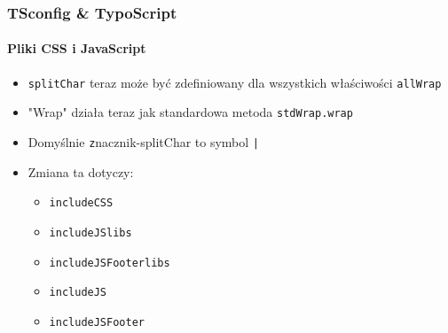 
\begin{frame}[fragile]
	\frametitle{TSconfig \& TypoScript}
	\framesubtitle{Pliki CSS i JavaScript}

	\begin{itemize}
		\item \texttt{splitChar} teraz może być zdefiniowany dla wszystkich właściwości \texttt{allWrap}
		\item "Wrap" działa teraz jak standardowa metoda \texttt{stdWrap.wrap}
		\item Domyślnie \texttt znacznik-{splitChar} to symbol \texttt{|}
		\item Zmiana ta dotyczy:

			\begin{itemize}
				\item \texttt{includeCSS}
				\item \texttt{includeJSlibs}
				\item \texttt{includeJSFooterlibs}
				\item \texttt{includeJS}
				\item \texttt{includeJSFooter}
			\end{itemize}

	\end{itemize}

\end{frame}


